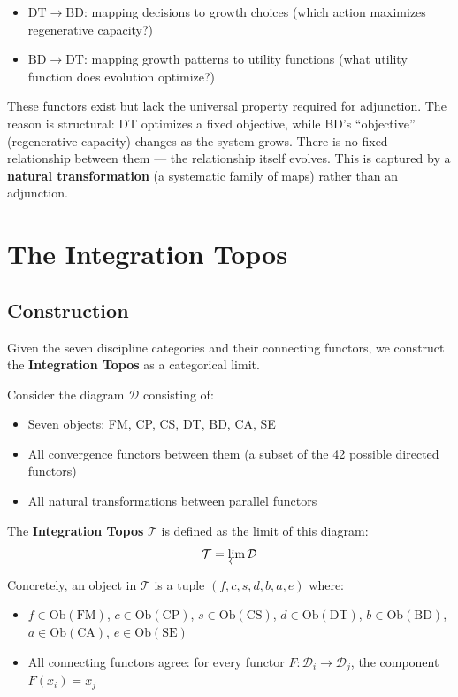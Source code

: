 \documentclass[11pt,a4paper]{article}
\begin{document}
\begin{itemize}
    \item $\mathrm{DT} \to \mathrm{BD}$: mapping decisions to growth choices (which action maximizes regenerative capacity?)
    \item $\mathrm{BD} \to \mathrm{DT}$: mapping growth patterns to utility functions (what utility function does evolution optimize?)
\end{itemize}

These functors exist but lack the universal property required for adjunction. The reason is structural: DT optimizes a fixed objective, while BD's ``objective'' (regenerative capacity) changes as the system grows. There is no fixed relationship between them --- the relationship itself evolves. This is captured by a \textbf{natural transformation} (a systematic family of maps) rather than an adjunction.

\section{The Integration Topos}

\subsection{Construction}

Given the seven discipline categories and their connecting functors, we construct the \textbf{Integration Topos} as a categorical limit.

Consider the diagram $\mathcal{D}$ consisting of:
\begin{itemize}
    \item Seven objects: FM, CP, CS, DT, BD, CA, SE
    \item All convergence functors between them (a subset of the 42 possible directed functors)
    \item All natural transformations between parallel functors
\end{itemize}

The \textbf{Integration Topos} $\mathcal{T}$ is defined as the limit of this diagram:
\begin{equation}
\mathcal{T} = \varprojlim \mathcal{D}
\end{equation}

Concretely, an object in $\mathcal{T}$ is a tuple $(f, c, s, d, b, a, e)$ where:
\begin{itemize}
    \item $f \in \mathrm{Ob}(\mathrm{FM})$, $c \in \mathrm{Ob}(\mathrm{CP})$, $s \in \mathrm{Ob}(\mathrm{CS})$, $d \in \mathrm{Ob}(\mathrm{DT})$, $b \in \mathrm{Ob}(\mathrm{BD})$, $a \in \mathrm{Ob}(\mathrm{CA})$, $e \in \mathrm{Ob}(\mathrm{SE})$
    \item All connecting functors agree: for every functor $F: \mathcal{D}_i \to \mathcal{D}_j$, the component $F(x_i) = x_j$
\end{itemize}
\end{document}
